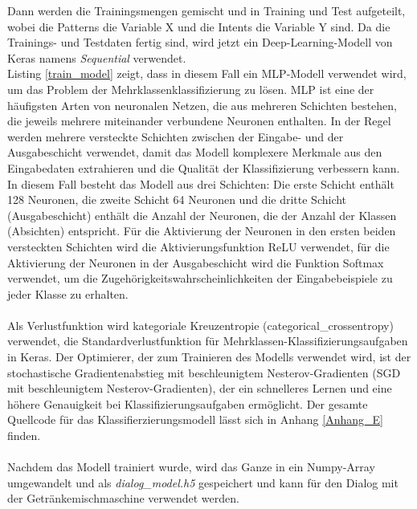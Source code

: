 Dann werden die Trainingsmengen gemischt und in Training und Test aufgeteilt, wobei die Patterns die Variable X und die Intents die Variable Y sind. 
Da die Trainings- und Testdaten fertig sind, wird jetzt ein Deep-Learning-Modell von Keras namens \textit{Sequential} verwendet.\\

Listing \ref{train_model} zeigt, dass in diesem Fall ein \ac{MLP}-Modell verwendet wird, um das Problem der Mehrklassenklassifizierung zu lösen. 
\ac{MLP} ist eine der häufigsten Arten von neuronalen Netzen, die aus mehreren Schichten bestehen, die jeweils mehrere miteinander verbundene Neuronen enthalten. 
In der Regel werden mehrere versteckte Schichten zwischen der Eingabe- und der Ausgabeschicht verwendet, damit das Modell komplexere Merkmale aus den Eingabedaten extrahieren und die Qualität der Klassifizierung verbessern kann. 
In diesem Fall besteht das Modell aus drei Schichten: Die erste Schicht enthält 128 Neuronen, die zweite Schicht 64 Neuronen und die dritte Schicht (Ausgabeschicht) enthält die Anzahl der Neuronen, die der Anzahl der Klassen (Absichten) entspricht. 
Für die Aktivierung der Neuronen in den ersten beiden versteckten Schichten wird die Aktivierungsfunktion \ac{ReLU} verwendet, für die Aktivierung der Neuronen in der Ausgabeschicht wird die Funktion Softmax verwendet, um die Zugehörigkeitswahrscheinlichkeiten der Eingabebeispiele zu jeder Klasse zu erhalten.\\\\
Als Verlustfunktion wird kategoriale Kreuzentropie (categorical\_crossentropy) verwendet, die Standardverlustfunktion für Mehrklassen-Klassifizierungsaufgaben in Keras. 
Der Optimierer, der zum Trainieren des Modells verwendet wird, ist der stochastische Gradientenabstieg mit beschleunigtem Nesterov-Gradienten (SGD mit beschleunigtem Nesterov-Gradienten), der ein schnelleres Lernen und eine höhere Genauigkeit bei Klassifizierungsaufgaben ermöglicht. 
Der gesamte Quellcode für das Klassifierzierungsmodell lässt sich in Anhang \ref{Anhang_E} finden.\\\\
Nachdem das Modell trainiert wurde, wird das Ganze in ein Numpy-Array umgewandelt und als \textit{dialog\_model.h5} gespeichert und kann für den Dialog mit der Getränkemischmaschine verwendet werden.
